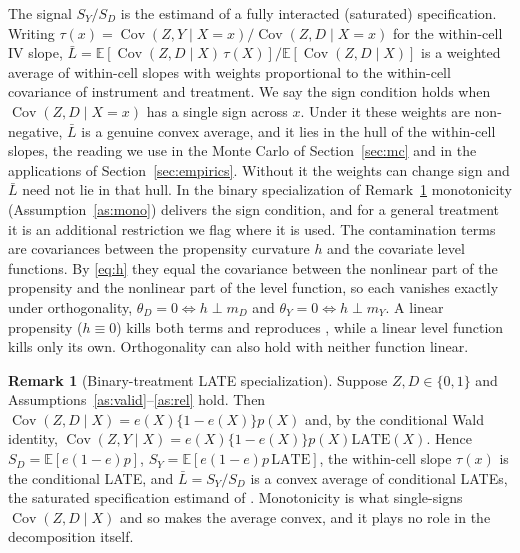 \documentclass[preprint,11pt,authoryear]{elsarticle}
\theoremstyle{definition}
\newtheorem{remark}{Remark}
\newcommand{\E}{\mathbb{E}}
\newcommand{\Cov}{\operatorname{Cov}}
\newcommand{\late}{\mathrm{LATE}}
\begin{document}
The signal $S_Y/S_D$ is the estimand of a fully interacted (saturated)
specification. Writing $\tau(x)=\Cov(Z,Y\mid X=x)/\Cov(Z,D\mid X=x)$ for the
within-cell IV slope, $\bar L=\E[\Cov(Z,D\mid X)\,\tau(X)]/\E[\Cov(Z,D\mid X)]$ is a
weighted average of within-cell slopes with weights proportional to the within-cell
covariance of instrument and treatment. We say the sign condition holds when
$\Cov(Z,D\mid X=x)$ has a single sign across $x$. Under it these weights are
non-negative, $\bar L$ is a genuine convex average, and it lies in the hull of the
within-cell slopes, the reading we use in the Monte Carlo of Section~\ref{sec:mc} and
in the applications of Section~\ref{sec:empirics}. Without it the weights can change
sign and $\bar L$ need not lie in that hull. In the binary specialization of
Remark~\ref{rem:binary} monotonicity (Assumption~\ref{as:mono}) delivers the sign
condition, and for a general treatment it is an additional restriction we flag where it
is used. The contamination terms are covariances between the propensity
curvature $h$ and the covariate level functions. By \eqref{eq:h} they equal the
covariance between the nonlinear part of the propensity and the
nonlinear part of the level function, so each vanishes exactly under
orthogonality, $\theta_D=0\iff h\perp m_D$ and $\theta_Y=0\iff h\perp m_Y$. A linear
propensity ($h\equiv0$) kills both terms and reproduces \citet{blandhol2022}, while a
linear level function kills only its own. Orthogonality can also hold with neither
function linear.

\begin{remark}[Binary-treatment LATE specialization]\label{rem:binary}
Suppose $Z,D\in\{0,1\}$ and Assumptions~\ref{as:valid}--\ref{as:rel} hold. Then
$\Cov(Z,D\mid X)=e(X)\{1-e(X)\}p(X)$ and, by the conditional Wald identity,
$\Cov(Z,Y\mid X)=e(X)\{1-e(X)\}p(X)\late(X)$. Hence $S_D=\E[e(1-e)p]$,
$S_Y=\E[e(1-e)p\,\late]$, the within-cell slope $\tau(x)$ is the conditional LATE, and
$\bar L=S_Y/S_D$ is a convex average of conditional LATEs, the
saturated specification estimand of \citet{blandhol2022}. Monotonicity is what
single-signs $\Cov(Z,D\mid X)$ and so makes the average convex, and it plays no role in
the decomposition itself.
\end{remark}
\end{document}
